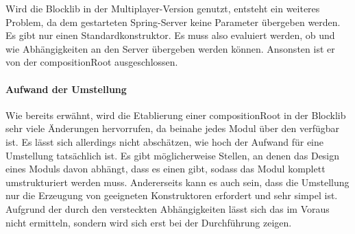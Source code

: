 Wird die Blocklib in der Multiplayer-Version genutzt, entsteht ein weiteres Problem, da dem gestarteten Spring-Server keine Parameter übergeben werden. Es gibt nur einen Standardkonstruktor. Es muss also evaluiert werden, ob und wie Abhängigkeiten an den Server übergeben werden können. Ansonsten ist er von der \gls{compositionRoot} ausgeschlossen.

\paragraph{Aufwand der Umstellung}
Wie bereits erwähnt, wird die Etablierung einer \gls{compositionRoot} in der Blocklib sehr viele Änderungen hervorrufen, da beinahe jedes Modul über den \classContext{} verfügbar ist. Es lässt sich allerdings nicht abschätzen, wie hoch der Aufwand für eine Umstellung tatsächlich ist. Es gibt möglicherweise Stellen, an denen das Design eines Moduls davon abhängt, dass es einen \classContext{} gibt, sodass das Modul komplett umstrukturiert werden muss. Andererseits kann es auch sein, dass die Umstellung nur die Erzeugung von geeigneten Konstruktoren erfordert und sehr simpel ist. Aufgrund der durch den \classContext{} versteckten Abhängigkeiten lässt sich das im Voraus nicht ermitteln, sondern wird sich erst bei der Durchführung zeigen.
